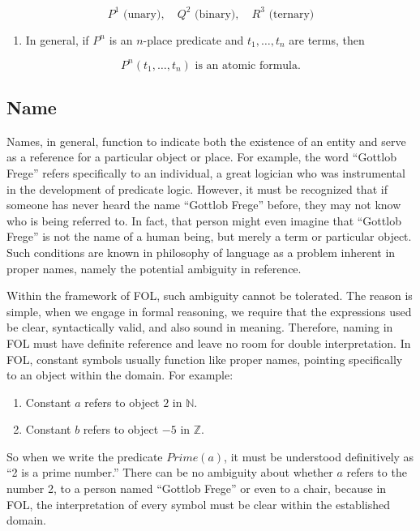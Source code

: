 \documentclass[12pt,a4paper,openany]{article}
\begin{document}
\[
  P^1 \text{ (unary)}, \quad Q^2 \text{ (binary)}, \quad R^3 \text{ (ternary)}
  \]

\begin{enumerate}
\def\labelenumi{\arabic{enumi}.}
\setcounter{enumi}{1}

\item
  In general, if \(P^n\) is an \(n\)-place predicate and
  \(t_1, \dots, t_n\) are terms, then
\end{enumerate}

\[P^n(t_1, \dots, t_n) \text{ is an atomic formula.}\]

\subsection{Name}\label{name}

Names, in general, function to indicate both the existence of an entity
and serve as a reference for a particular object or place. For example,
the word ``Gottlob Frege'' refers specifically to an individual, a great
logician who was instrumental in the development of predicate logic.
However, it must be recognized that if someone has never heard the name
``Gottlob Frege'' before, they may not know who is being referred to. In
fact, that person might even imagine that ``Gottlob Frege'' is not the
name of a human being, but merely a term or particular object. Such
conditions are known in philosophy of language as a problem inherent in
proper names, namely the potential ambiguity in reference.

Within the framework of FOL, such ambiguity cannot be tolerated. The
reason is simple, when we engage in formal reasoning, we require that
the expressions used be clear, syntactically valid, and also sound in
meaning. Therefore, naming in FOL must have definite reference and leave
no room for double interpretation. In FOL, constant symbols usually
function like proper names, pointing specifically to an object within
the domain. For example:

\begin{enumerate}
\def\labelenumi{\arabic{enumi}.}
\item
  Constant \(a\) refers to object \(2\) in \(\mathbb{N}\).
\item
  Constant \(b\) refers to object \(-5\) in \(\mathbb{Z}\).
\end{enumerate}

So when we write the predicate \(Prime(a)\), it must be understood
definitively as ``2 is a prime number.'' There can be no ambiguity about
whether \(a\) refers to the number 2, to a person named ``Gottlob
Frege'' or even to a chair, because in FOL, the interpretation of every
symbol must be clear within the established domain.
\end{document}
